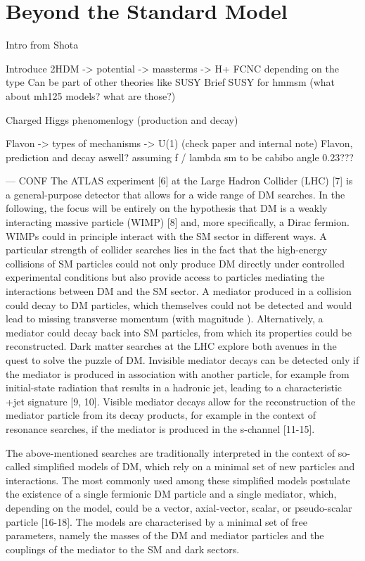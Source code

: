 \section{Beyond the Standard Model}
Intro from Shota 

Introduce 2HDM -> potential -> massterms -> H+
FCNC depending on the type
Can be part of other theories like SUSY
Brief SUSY for hmmsm 
(what about mh125 models? what are those?)

Charged Higgs phenomenlogy (production and decay)

Flavon -> types of mechanisms -> U(1) (check paper and internal note)
Flavon, prediction and decay aswell?
assuming f / lambda sm to be cabibo angle 0.23???


---
CONF %
The ATLAS experiment [6] at the Large Hadron Collider (LHC) [7] is a general-purpose detector that allows
for a wide range of DM searches. In the following, the focus will be entirely on the hypothesis that DM is a
weakly interacting massive particle (WIMP) [8] and, more specifically, a Dirac fermion. WIMPs could in
principle interact with the SM sector in different ways. A particular strength of collider searches lies in the
fact that the high-energy collisions of SM particles could not only produce DM directly under controlled
experimental conditions but also provide access to particles mediating the interactions between DM and
the SM sector. A mediator produced in a collision could decay to DM particles, which themselves could
not be detected and would lead to missing transverse momentum (with magnitude \MET). Alternatively, a
mediator could decay back into SM particles, from which its properties could be reconstructed.
Dark matter searches at the LHC explore both avenues in the quest to solve the puzzle of DM. Invisible
mediator decays can be detected only if the mediator is produced in association with another particle,
for example from initial-state radiation that results in a hadronic jet, leading to a characteristic \MET+jet
signature [9, 10]. Visible mediator decays allow for the reconstruction of the mediator particle from
its decay products, for example in the context of resonance searches, if the mediator is produced in the
s-channel [11-15].

The above-mentioned searches are traditionally interpreted in the context of so-called simplified models of
DM, which rely on a minimal set of new particles and interactions. The most commonly used among these
simplified models postulate the existence of a single fermionic DM particle and a single mediator, which,
depending on the model, could be a vector, axial-vector, scalar, or pseudo-scalar particle [16-18]. The
models are characterised by a minimal set of free parameters, namely the masses of the DM and mediator
particles and the couplings of the mediator to the SM and dark sectors.

